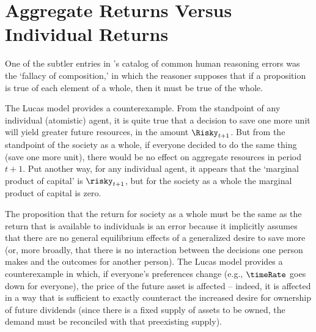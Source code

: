 \documentclass{handout}
\begin{document}

\section{Aggregate Returns Versus Individual Returns}

One of the subtler entries in \cite{aristotleFallacies}'s catalog of common human reasoning errors was the `fallacy of composition,' in which the reasoner supposes that if a proposition is true of each element of a whole, then it must be true of the whole.

The Lucas model provides a counterexample.  From the standpoint of any individual (atomistic) agent, it is quite true that a decision to save one more unit will yield greater future resources, in the amount $\Risky_{t+1}$.  But from the standpoint of the society as a whole, if everyone decided to do the same thing (save one more unit), there would be no effect on aggregate resources in period $t+1$.  Put another way, for any individual agent, it appears that the `marginal product of capital' is $\risky_{t+1}$, but for the society as a whole the marginal product of capital is zero.

The proposition that the return for society as a whole must be the same as the return that is available to individuals is an error because it implicitly assumes that there are no general equilibrium effects of a generalized desire to save more (or, more broadly, that there is no interaction between the decisions one person makes and the outcomes for another person).  The Lucas model provides a counterexample in which, if everyone's preferences change (e.g., $\timeRate$ goes down for everyone), the price of the future asset is affected -- indeed, it is affected in a way that is sufficient to exactly counteract the increased desire for ownership of future dividends (since there is a fixed supply of assets to be owned, the demand must be reconciled with that preexisting supply).
\end{document}
